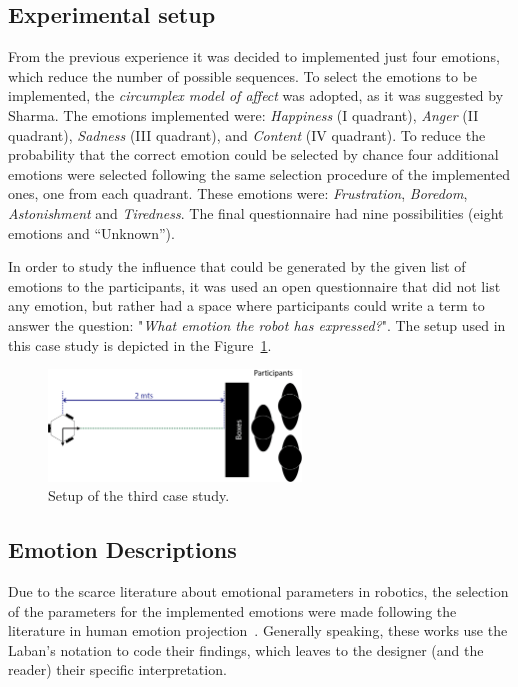 \subsection{Experimental setup}

From the previous experience it was decided to implemented just four emotions, which reduce the number of possible sequences. To select the emotions to be implemented, the \textit{circumplex model of affect} was adopted, as it was suggested by Sharma. The emotions implemented were: \textit{Happiness} (I quadrant), \textit{Anger} (II quadrant), \textit{Sadness} (III quadrant), and \textit{Content} (IV quadrant). To reduce the probability that the correct emotion could be selected by chance four additional emotions were selected following the same selection procedure of the implemented ones, one from each quadrant. These emotions were: \textit{Frustration}, \textit{Boredom}, \textit{Astonishment} and \textit{Tiredness}. The final questionnaire had nine possibilities (eight emotions and ``Unknown''). 

In order to study the influence that could be generated by the given list of emotions to the participants, it was used an open questionnaire that did not list any emotion, but rather had a space where participants could write a term to answer the question: "\textit{What emotion the robot has expressed?}".
The setup used in this case study is depicted in the Figure~\ref{fig:setup2}.

\begin{figure}[h]
	\centering
	\includegraphics[width=0.6\textwidth]{./Images/ThirdCase.png} 
	\caption{Setup of the third case study.}
	\label{fig:setup2} 
\end{figure}

\subsection{Emotion Descriptions} 

Due to the scarce literature about emotional parameters in robotics, the selection of the parameters for the implemented emotions were made following the literature in human emotion projection~\cite{Nadia2013, Crane2013}.
Generally speaking, these works use the Laban's notation to code their findings, which leaves to the designer (and the reader) their specific interpretation.

